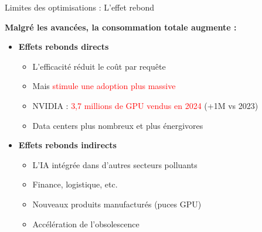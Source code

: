 \begin{frame}{Limites des optimisations : L'effet rebond}

\textbf{Malgré les avancées, la consommation totale augmente :}

\vspace{0.3cm}

\begin{itemize}
    \item<+-> \textbf{Effets rebonds directs}
        \begin{itemize}
            \item L'efficacité réduit le coût par requête
            \item Mais \textcolor{red}{stimule une adoption plus massive}
            \item NVIDIA : \textcolor{red}{3,7 millions de GPU vendus en 2024} (+1M vs 2023)
            \item Data centers plus nombreux et plus énergivores
        \end{itemize}

    \vspace{0.2cm}
    \item<+-> \textbf{Effets rebonds indirects}
        \begin{itemize}
            \item L'IA intégrée dans d'autres secteurs polluants
            \item Finance, logistique, etc.
            \item Nouveaux produits manufacturés (puces GPU)
            \item Accélération de l'obsolescence
        \end{itemize}
\end{itemize}

\end{frame}

